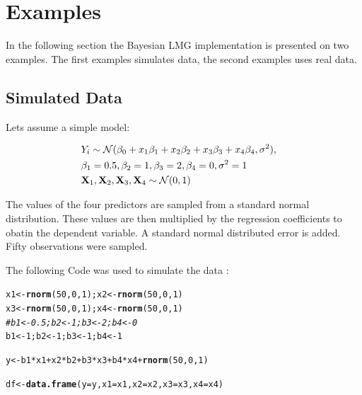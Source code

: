 \documentclass[11pt,a4paper,twoside]{book}
\makeatletter
\newcommand{\hlnum}[1]{\textcolor[rgb]{0.686,0.059,0.569}{#1}}%
\newcommand{\hlcom}[1]{\textcolor[rgb]{0.678,0.584,0.686}{\textit{#1}}}%
\newcommand{\hlopt}[1]{\textcolor[rgb]{0,0,0}{#1}}%
\newcommand{\hlstd}[1]{\textcolor[rgb]{0.345,0.345,0.345}{#1}}%
\newcommand{\hlkwb}[1]{\textcolor[rgb]{0.69,0.353,0.396}{#1}}%
\newcommand{\hlkwc}[1]{\textcolor[rgb]{0.333,0.667,0.333}{#1}}%
\newcommand{\hlkwd}[1]{\textcolor[rgb]{0.737,0.353,0.396}{\textbf{#1}}}%
\newenvironment{kframe}{%
 \def\at@end@of@kframe{}%
 \ifinner\ifhmode%
  \def\at@end@of@kframe{\end{minipage}}%
  \begin{minipage}{\columnwidth}%
 \fi\fi%
 \def\FrameCommand##1{\hskip\@totalleftmargin \hskip-\fboxsep
 \colorbox{shadecolor}{##1}\hskip-\fboxsep
     \hskip-\linewidth \hskip-\@totalleftmargin \hskip\columnwidth}%
 \MakeFramed {\advance\hsize-\width
   \@totalleftmargin\z@ \linewidth\hsize
   \@setminipage}}%
 {\par\unskip\endMakeFramed%
 \at@end@of@kframe}
\newenvironment{knitrout}{}{} %
\makeatother
\begin{document}






\chapter{Examples}

In the following section the Bayesian LMG implementation is presented on two examples. The first examples simulates data, the second examples uses real data.

\section{Simulated Data}

Lets assume a simple model: 

\begin{align} 
&Y_{i} \sim \mathcal{N}(\beta_{0}+x_{1} \beta_{1}+x_{2} \beta_{2}+x_{3} \beta_{3}+x_{4} \beta_{4}, \sigma^2),& \\ & \beta_{1} = 0.5, \beta_{2} = 1,  \beta_{3} = 2 , \beta_{4}=0, \sigma^2 = 1 & \\ & {\mathbf{X}}_{1}, {\mathbf{X}}_{2},{\mathbf{X}}_{3},{\mathbf{X}}_{4} \sim \mathcal{N}(0, 1)&
\end{align} 


The values of the four predictors are sampled from a standard normal distribution. These values are then multiplied by the regression coefficients to obatin the dependent variable. A standard normal distributed error is added. Fifty observations were sampled.

The following Code was used to simulate the data :

\begin{knitrout}
\color{fgcolor}\begin{kframe}
\begin{alltt}
\hlstd{x1} \hlkwb{<-} \hlkwd{rnorm}\hlstd{(}\hlnum{50}\hlstd{,} \hlnum{0}\hlstd{,} \hlnum{1}\hlstd{); x2} \hlkwb{<-} \hlkwd{rnorm}\hlstd{(}\hlnum{50}\hlstd{,} \hlnum{0}\hlstd{,} \hlnum{1}\hlstd{)}
\hlstd{x3} \hlkwb{<-} \hlkwd{rnorm}\hlstd{(}\hlnum{50}\hlstd{,} \hlnum{0}\hlstd{,} \hlnum{1}\hlstd{); x4} \hlkwb{<-} \hlkwd{rnorm}\hlstd{(}\hlnum{50}\hlstd{,} \hlnum{0}\hlstd{,} \hlnum{1}\hlstd{)}
\hlcom{#b1 <- 0.5; b2 <- 1; b3 <- 2; b4 <- 0}
\hlstd{b1} \hlkwb{<-} \hlnum{1}\hlstd{; b2} \hlkwb{<-} \hlnum{1}\hlstd{; b3} \hlkwb{<-} \hlnum{1}\hlstd{; b4} \hlkwb{<-} \hlnum{1}

\hlstd{y} \hlkwb{<-} \hlstd{b1}\hlopt{*}\hlstd{x1} \hlopt{+} \hlstd{x2}\hlopt{*}\hlstd{b2} \hlopt{+} \hlstd{b3}\hlopt{*}\hlstd{x3} \hlopt{+} \hlstd{b4}\hlopt{*}\hlstd{x4} \hlopt{+} \hlkwd{rnorm}\hlstd{(}\hlnum{50}\hlstd{,} \hlnum{0}\hlstd{,} \hlnum{1}\hlstd{)}

\hlstd{df} \hlkwb{<-} \hlkwd{data.frame}\hlstd{(}\hlkwc{y} \hlstd{= y,} \hlkwc{x1} \hlstd{= x1,} \hlkwc{x2} \hlstd{= x2,} \hlkwc{x3} \hlstd{= x3,} \hlkwc{x4} \hlstd{= x4)}
\end{alltt}
\end{kframe}
\end{knitrout}
\end{document}
